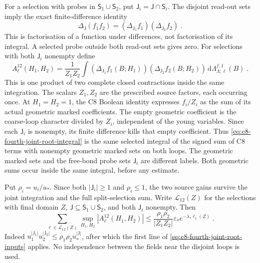 \documentclass[11pt]{article}
\newcommand{\dd}{\mathrm{d}}
\begin{document}
For a selection with probes in $\mathsf S_1\cup\mathsf S_2$,
put $\mathsf J_i=\mathsf J\cap\mathsf S_i$. The disjoint
read-out sets imply the exact finite-difference identity
\begin{equation}\label{eq:c8-fourth-two-source-difference}
    \Delta_{\mathsf J}(f_1f_2)
        =(\Delta_{\mathsf J_1}f_1)
            (\Delta_{\mathsf J_2}f_2)\;.
\end{equation}
This is factorisation of a function under differences,
not factorisation of its integral. A selected probe outside
both read-out sets gives zero.
For selections with both $\mathsf J_i$ nonempty define
\begin{equation}\label{eq:c8-fourth-joint-root-integral}
    A_\ell^{12}(H_1,H_2)
        =\frac{1}{Z_1Z_2}
            \int
                (\Delta_{\mathsf J_1}f_1(B;H_1))
                (\Delta_{\mathsf J_2}f_2(B;H_2))\,
                    \dd\Lambda^{f,1}_{\Lambda;\ell}(B)\;.
\end{equation}
This is one product of two complete closed contractions
inside the same integration. The scalars $Z_1,Z_2$ are the
prescribed source factors, each occurring once.
At $H_1=H_2=1$, the C8 Boolean identity expresses
$f_i/Z_i$ as the sum of its actual geometric marked
coefficients. The empty geometric coefficient is the
coarse-loop character divided by $Z_i$, independent of
the young variables. Since each $\mathsf J_i$ is nonempty,
its finite difference kills that empty coefficient.
Thus \eqref{eq:c8-fourth-joint-root-integral} is the same
selected integral of the signed sum of C8 terms with
nonempty geometric marked sets on both loops. The geometric
marked sets and the free-bond probe sets $\mathsf J_i$
are different labels. Both geometric sums occur inside the
same integral, before any estimate.

Put $\rho_i=u_i/u_*$. Since both $|\mathsf J_i|\geq1$ and
$\rho_i\leq1$, the two source gains survive the joint
integration and the full split-selection sum. Write
$\mathscr L_{12}(Z)$ for the selections with final domain $Z$,
$\mathsf J\subseteq\mathsf S_1\cup\mathsf S_2$, and both
$\mathsf J_i$ nonempty. Then
\begin{equation}\label{eq:c8-fourth-joint-root-bound}
    \sum_{\ell\in\mathscr L_{12}(Z)}
        \sup_{H_1,H_2}|A_\ell^{12}(H_1,H_2)|
        \leq
            \frac{\rho_1\rho_2}{|Z_1Z_2|}
                \varepsilon_*e^{-\lambda_*\ell_1(Z)}\;.
\end{equation}
Indeed $u_1^{|\mathsf J_1|}u_2^{|\mathsf J_2|}
\leq\rho_1\rho_2u_*^{|\mathsf J|}$, after which the first
line of \eqref{eq:c8-fourth-joint-root-inputs} applies.
No independence between the fields near the disjoint loops
is used.
\end{document}
